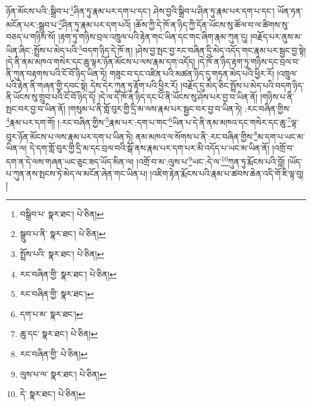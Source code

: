 ཉོན་མོངས་པའི་:སྒྲིབ་པ་\footnote{བསྒྲིབ་པ་  སྣར་ཐང་།  པེ་ཅིན། }ཤིན་ཏུ་རྣམ་པར་དག་པ་དང་། ཤེས་བྱའི་སྒྲིབ་པ་ཤིན་ཏུ་རྣམ་པར་དག་པ་དང་། ཡོན་ཏན་མངོན་པར་:སྒྲུབ་པ་\footnote{སྒྲུབ་པ་ནི་  སྣར་ཐང་།  པེ་ཅིན། }ཤིན་ཏུ་རྣམ་པར་དག་པའོ། །ཆོས་ཀྱི་དེ་ཁོ་ན་ཉིད་ཀྱི་དོན་ཡོངས་སུ་ཚོལ་བ་ལ་ཚིགས་སུ་བཅད་པ་གཉིས་སོ། །རྟག་ཏུ་གཉིས་བྲལ་འཁྲུལ་པའི་རྟེན་གང་ཡིན་དང་གང་ཞིག་རྣམ་ཀུན་དུ། །བརྗོད་པར་ནུས་མ་ཡིན་ཞིང་:སྤྲོས་པ་མེད་པའི་\footnote{སྤྲོས་པའི་  སྣར་ཐང་།  པེ་ཅིན། }བདག་ཉིད་དེ་ཁོ་ན། །ཤེས་བྱ་སྤང་བྱ་རང་བཞིན་དྲི་མེད་འདོད་གང་རྣམ་པར་སྦྱང་བྱ་སྟེ། །དེ་ནི་ནམ་མཁའ་གསེར་དང་ཆུ་ལྟར་ཉོན་མོངས་པ་ལས་རྣམ་དག་འདོད། །དེ་ཁོ་ན་ཉིད་རྟག་ཏུ་གཉིས་དང་བྲལ་བ་ནི་ཀུན་བརྟགས་པའི་ངོ་བོ་ཉིད་ཡིན་ཏེ། གཟུང་བ་དང་འཛིན་པའི་མཚན་ཉིད་དུ་གཏན་མེད་པའི་ཕྱིར་རོ། །འཁྲུལ་པའི་རྟེན་ནི་གཞན་གྱི་དབང་སྟེ། དེས་དེར་ཀུན་ཏུ་རྟོག་པའི་ཕྱིར་རོ། །བརྗོད་དུ་མེད་ཅིང་སྤྲོས་པ་མེད་པའི་བདག་ཉིད་ནི་ཡོངས་སུ་གྲུབ་པའི་ངོ་བོ་ཉིད་དོ། །དེ་ལ་དེ་ཁོ་ན་ཉིད་དང་པོ་ནི་ཡོངས་སུ་ཤེས་པར་བྱ་བ་ཡིན་ནོ། །གཉིས་པ་ནི་སྤང་བར་བྱ་བ་ཡིན་ནོ། །གསུམ་པ་ནི་གློ་བུར་གྱི་དྲི་མ་ལས་རྣམ་པར་སྦྱང་བར་བྱ་བ་ཡིན་ཏེ། :རང་བཞིན་གྱིས་\footnote{རང་བཞིན་གྱི་  སྣར་ཐང་།  པེ་ཅིན། }རྣམ་པར་དག་གོ། །:རང་བཞིན་གྱིས་\footnote{རང་བཞིན་གྱི་  སྣར་ཐང་། }རྣམ་པར་:དག་པ་གང་\footnote{དག་པ་མ་  སྣར་ཐང་། }ཡིན་པ་དེ་ནི་ནམ་མཁའ་དང་གསེར་དང་ཆུ་\footnote{ཆུ་དང་  སྣར་ཐང་།  པེ་ཅིན། }ལྟ་བུར་ཉོན་མོངས་པ་ལས་རྣམ་པར་དག་པ་ཡིན་ཏེ། ནམ་མཁའ་ལ་སོགས་པ་ནི་:རང་བཞིན་གྱིས་\footnote{རང་བཞིན་གྱི་  པེ་ཅིན། }མ་དག་པ་ཡང་མ་ཡིན་ལ། དེ་དག་གློ་བུར་གྱི་དྲི་མ་དང་བྲལ་བའི་སྒོ་ནས་རྣམ་པར་དག་པར་མི་འདོད་པ་ཡང་མ་ཡིན་ནོ། །འགྲོ་བ་དག་ན་དེ་ལས་གཞན་ཡང་ཅུང་ཟད་ཡོད་མིན་ལ། །འགྲོ་བ་མ་:ལུས་པ་\footnote{ལུས་པ་ལ་  སྣར་ཐང་།  པེ་ཅིན། }ཡང་:དེ་ལ་\footnote{དེ་  སྣར་ཐང་།  པེ་ཅིན། }ཀུན་ཏུ་རྨོངས་པའི་བློ། །ཡོད་པ་ཀུན་ནས་སྤངས་ཏེ་མེད་ལ་མངོན་ཞེན་གང་ཡིན་པ། །འཇིག་རྟེན་རྨོངས་པའི་རྣམ་པ་ཚབས་ཆེན་འདི་གོ་ཇི་ལྟ་བུ། །
